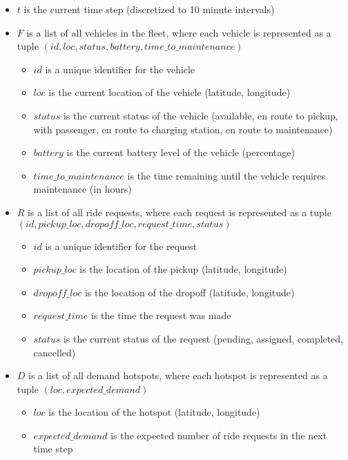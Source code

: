 \documentclass[12pt]{article}
\begin{document}
\begin{itemize}
		\item $t$ is the current time step (discretized to 10 minute intervals)
		\item $F$ is a list of all vehicles in the fleet, where each vehicle is represented as
				a tuple $(id, loc, status, battery, time\_to\_maintenance)$
    \begin{itemize}
						\item $id$ is a unique identifier for the vehicle
						\item $loc$ is the current location of the vehicle (latitude, longitude)
						\item $status$ is the current status of the vehicle (available, en route to pickup,
								with passenger, en route to charging station, en route to maintenance)
						\item $battery$ is the current battery level of the vehicle (percentage)
						\item $time\_   to\_maintenance$ is the time remaining until the vehicle requires
								maintenance (in hours)
    \end{itemize}
		\item $R$ is a list of all ride requests, where each request is represented as a tuple
				$(id, pickup\_loc, dropoff\_loc, request\_time, status)$
    \begin{itemize}
						\item $id$ is a unique identifier for the request
						\item $pickup\_loc$ is the location of the pickup (latitude, longitude)
						\item $dropoff\_loc$ is the location of the dropoff (latitude, longitude)
						\item $request\_time$ is the time the request was made
						\item $status$ is the current status of the request (pending, assigned, completed, cancelled)
    \end{itemize}
		\item $D$ is a list of all demand hotspots, where each hotspot is represented as a
				tuple $(loc, expected\_demand)$
    \begin{itemize}
						\item $loc$ is the location of the hotspot (latitude, longitude)
						\item $expected\_demand$ is the expected number of ride requests in the next time step
    \end{itemize}
\end{itemize}
\end{document}
